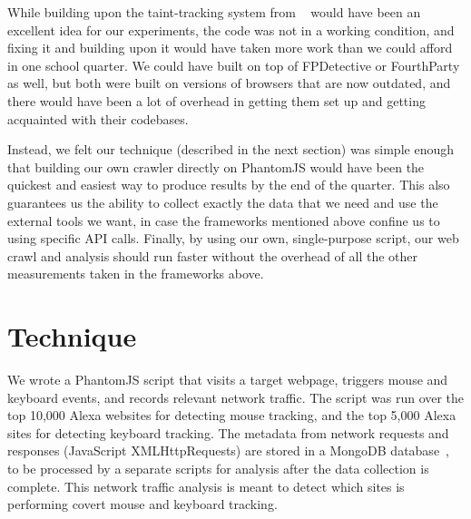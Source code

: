 \documentclass[letterpaper,twocolumn,10pt]{article}
\begin{document}
While building upon the taint-tracking system from ~\cite{tainttracking} would have been an excellent idea for our experiments, the code was not in a working condition, and fixing it and building upon it would have taken more work than we could afford in one school quarter. We could have built on top of FPDetective or FourthParty as well, but both were built on versions of browsers that are now outdated, and there would have been a lot of overhead in getting them set up and getting acquainted with their codebases.

Instead, we felt our technique (described in the next section) was simple enough that building our own crawler directly on PhantomJS would have been the quickest and easiest way to produce results by the end of the quarter. This also guarantees us the ability to collect exactly the data that we need and use the external tools we want, in case the frameworks mentioned above confine us to using specific API calls. Finally, by using our own, single-purpose script, our web crawl and analysis should run faster without the overhead of all the other measurements taken in the frameworks above.

\section{Technique}

We wrote a PhantomJS script that visits a target webpage, triggers mouse and keyboard events, and records relevant network traffic. The script was run over the top 10,000 Alexa websites for detecting mouse tracking, and the top 5,000 Alexa sites for detecting keyboard tracking. The metadata from network requests and responses (JavaScript XMLHttpRequests) are stored in a MongoDB database~\cite{mongodb}, to be processed by a separate scripts for analysis after the data collection is complete. This network traffic analysis is meant to detect which sites is performing covert mouse and keyboard tracking.
\end{document}
